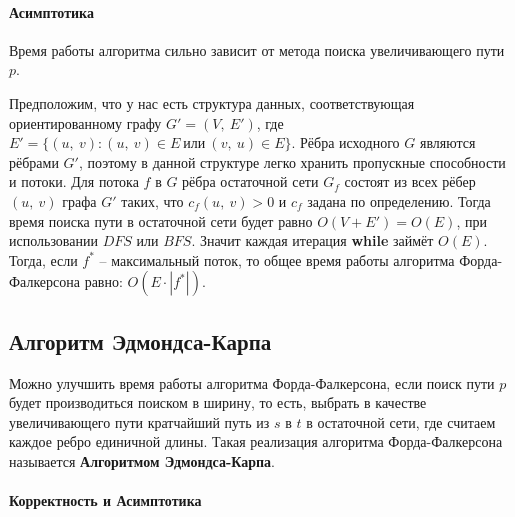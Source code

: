 \documentclass[a4paper,12pt]{article}
\begin{document}
\paragraph{Асимптотика}

Время работы алгоритма сильно зависит от метода поиска увеличивающего пути $p$.

Предположим, что у нас есть структура данных, соответствующая ориентированному графу $G' = (V,\ E')$, где $E' = \{(u,\ v): (u,\ v) \in E\ \text{или}\ (v,\ u) \in E\}$. Рёбра исходного $G$ являются рёбрами $G'$, поэтому в данной структуре легко хранить пропускные способности и потоки. Для потока $f$ в $G$ рёбра остаточной сети $G_f$ состоят из всех рёбер $(u,\ v)$ графа $G'$ таких, что $c_f(u,\ v) > 0$ и $c_f$ задана по определению. Тогда время поиска пути в остаточной сети будет равно $O(V + E') = O(E)$, при использовании $DFS$ или $BFS$. Значит каждая итерация \textbf{while} займёт $O(E)$. Тогда, если $f^*$ -- максимальный поток, то общее время работы алгоритма Форда-Фалкерсона равно: $O(E \cdot |f^*|)$.

\subsection{Алгоритм Эдмондса-Карпа}

Можно улучшить время работы алгоритма Форда-Фалкерсона, если поиск пути $p$ будет производиться поиском в ширину, то есть, выбрать в качестве увеличивающего пути кратчайший путь из $s$ в $t$ в остаточной сети, где считаем каждое ребро единичной длины. Такая реализация алгоритма Форда-Фалкерсона называется \textbf{Алгоритмом Эдмондса-Карпа}.

\paragraph{Корректность и Асимптотика}
\end{document}
